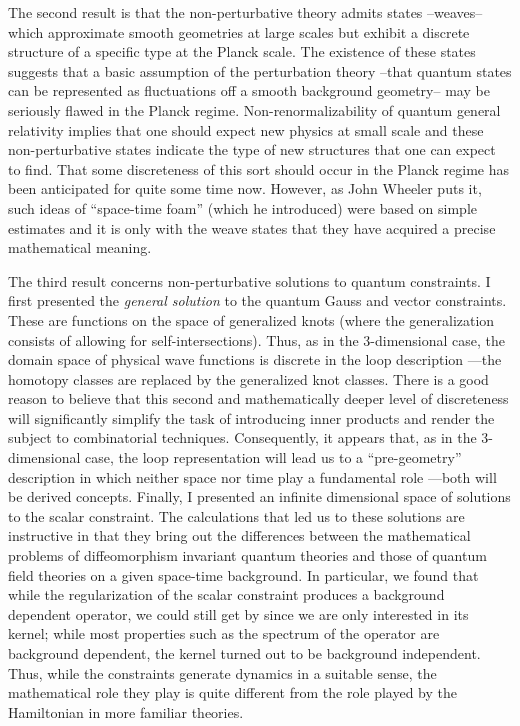 The second result is that the non-perturbative theory admits states --weaves--
which approximate smooth geometries at large scales but exhibit a discrete
structure of a specific type at the Planck scale. The existence of these
states suggests that a basic assumption of the perturbation theory
--that quantum states can be represented as fluctuations off a smooth
background geometry-- may be seriously flawed in the Planck regime.
Non-renormalizability of quantum general relativity implies that one should
expect new physics at small scale and these non-perturbative states indicate
the type of new structures that one can expect to find. That some discreteness
of this sort should occur in the Planck regime has been anticipated for quite
some time now. However, as John Wheeler puts it, such ideas of ``space-time
foam'' (which he introduced) were based on simple estimates and it is only
with the weave states that they have acquired a precise mathematical meaning.

The third result
concerns non-perturbative solutions to quantum constraints. I first
presented the {\it general solution} to the quantum Gauss and vector
constraints. These are functions on the space of generalized knots (where
the generalization consists of allowing for self-intersections). Thus,
as in the 3-dimensional case, the domain space of physical wave functions
is discrete in the loop description ---the homotopy classes are replaced by
the generalized knot classes. There is a good reason to believe that this
second and mathematically deeper level of discreteness will significantly
simplify the task of introducing inner products and render the subject to
combinatorial techniques. Consequently, it appears that, as in the
3-dimensional case, the loop representation will lead us to a ``pre-geometry''
description in which neither space nor time play a fundamental role ---both
will be derived concepts. Finally, I presented an infinite dimensional space
of solutions to the scalar constraint. The calculations that led us to these
solutions are instructive in that they bring out the differences between the
mathematical problems of diffeomorphism invariant quantum theories and those
of quantum field theories on a given space-time background. In particular, we
found that while the regularization of the scalar constraint produces a
background dependent operator, we could still get by since we are only
interested in its kernel; while most properties such as the spectrum of the
operator are background dependent, the kernel
turned out to be background independent. Thus, while the constraints generate
dynamics in a suitable sense, the mathematical role they play is quite
different from the role played by the Hamiltonian in more familiar theories.

